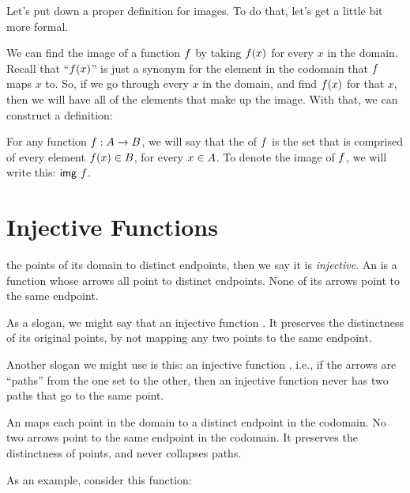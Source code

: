 \documentclass[../../../main.tex]{subfiles}
\begin{document}
Let's put down a proper definition for images. To do that, let's get a little bit more formal.

We can find the image of a function $f$ by taking $f(x)$ for every $x$ in the domain. Recall that ``$f(x)$'' is just a synonym for the element in the codomain that $f$ maps $x$ to. So, if we go through every $x$ in the domain, and find $f(x)$ for that $x$, then we will have all of the elements that make up the image. With that, we can construct a definition:

\begin{fdefinition}[Images]
  \label{def:images}
  For any function $f: A \rightarrow B$, we will say that the  of $f$ is the set that is comprised of every element $f(x) \in B$, for every $x \in A$. To denote the image of $f$, we will write this: $\mathsf{img}~f$.
\end{fdefinition}


\section{Injective Functions}

 the points of its domain to distinct endpoints, then we say it is \emph{injective}. An  is a function whose arrows all point to distinct endpoints. None of its arrows point to the same endpoint.

As a slogan, we might say that an injective function . It preserves the distinctness of its original points, by not mapping any two points to the same endpoint.

Another slogan we might use is this: an injective function , i.e., if the arrows are ``paths'' from the one set to the other, then an injective function never has two paths that go to the same point. 

\begin{terminology}
  An  maps each point in the domain to a distinct endpoint in the codomain. No two arrows point to the same endpoint in the codomain. It preserves the distinctness of points, and never collapses paths.
\end{terminology}

As an example, consider this function:
\end{document}
